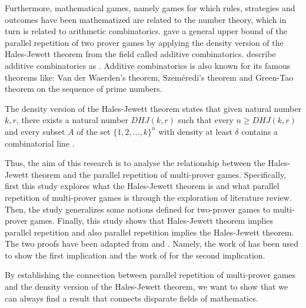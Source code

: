 Furthermore, mathematical games, namely games for which rules, strategies and outcomes have been mathematized are related to the number theory,
which in turn is related to  arithmetic combinatorics.
\cite{verbitsky1996towards} gave a general  upper bound of the parallel repetition of  two prover games by applying the density version of the Hales-Jewett theorem from the field called additive combinatorics. \cite*{taoadditive} describe
additive combinatorics  as  . Additive combinatorics is also known for its famous theorems like: Van der Waerden's theorem, Szeméredi's theorem and Green-Tao theorem on the sequence of prime numbers.


The density version of the Hales-Jewett theorem states that given natural number $k,r$, there exists a natural number $DHJ(k,r)$ such that every $n\geq DHJ(k,r)$ and every subset $A$ of the set $\{1,2,\ldots,k\}^n$ with density at least $\delta$  contains a  combinatorial line  \citep{polymath2012new}.

Thus, the aim of this research is to analyse the relationship between the Hales-Jewett theorem and the parallel repetition of multi-prover games. Specifically, first  this study explores what  the Hales-Jewett theorem is and what  parallel repetition of multi-prover games is through the exploration of literature review. Then, the study  generalizes some notions defined for two-prover games to multi-prover games.  Finally, this study shows that Hales-Jewett theorem implies parallel repetition and also parallel repetition implies the Hales-Jewett theorem. The two proofs have been adapted from \cite{verbitsky1996towards} and \cite*{hkazla2016forbidden}. Namely, the work of  \cite{verbitsky1996towards} has been used  to show the first implication and the work of  \cite*{hkazla2016forbidden} for the second implication.



By establishing the connection between parallel repetition of multi-prover games and the density version of the Hales-Jewett theorem, we want to show that we can always find a result that connects disparate fields of mathematics.

